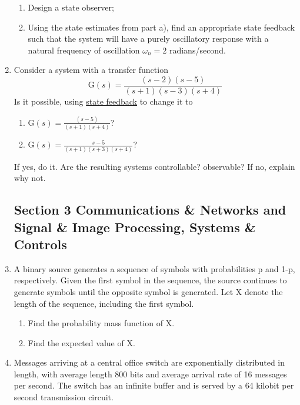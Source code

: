 \documentclass[main.tex]{subfiles}
\begin{document}
\begin{enumerate}
	\begin{enumerate}
	    \item Design a state observer;
	    \item Using the state estimates from part a), find an appropriate state feedback such that the system will have a purely oscillatory response with a natural frequency of oscillation $\omega_n = 2$ radians/second.
	\end{enumerate}
	
\item Consider a system with a transfer function 
$$\mathrm{G}(s)=\frac{(s-2)(s-5)}{(s+1)(s-3)(s+4)}$$
Is it possible, using \underline{state feedback} to change it to

    \begin{enumerate}
        \item $\mathrm{G}(s)=\frac{(s-5)}{(s+1)(s+4)}$?
        \item $\mathrm{G}(s)=\frac{s-5}{(s+1)(s+3)(s+4)}$?
    \end{enumerate}
    
If yes, do it. Are the resulting systems controllable? observable? If no, explain why not.

\subsection{Section 3 Communications \& Networks and Signal \& Image Processing, Systems \& Controls}

\item A binary source generates a sequence of symbols with probabilities p and 1-p, respectively. Given the first symbol in the sequence, the source continues to generate symbols until the opposite symbol is generated. Let X denote the length of the sequence, including the first symbol.

    \begin{enumerate}
        \item Find the probability mass function of X.
        \item Find the expected value of X.
    \end{enumerate}
    
\item Messages arriving at a central office switch are exponentially distributed in length, with average length 800 bits and average arrival rate of 16 messages per second. The switch has an infinite buffer and is served by a 64 kilobit per second transmission circuit.


\end{enumerate}
\end{document}
